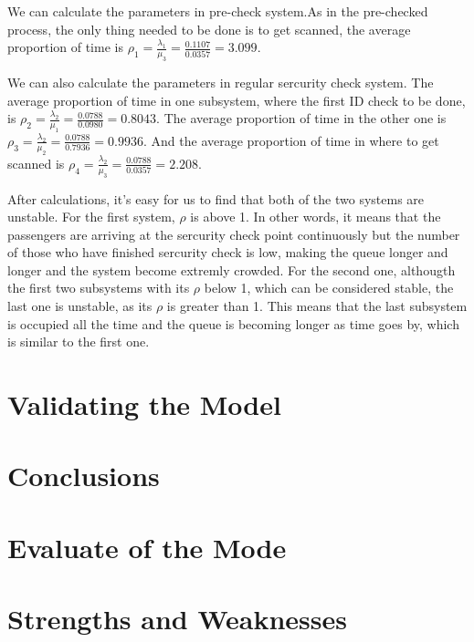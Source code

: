 \documentclass{mcmthesis}
\begin{document}
	We can calculate the parameters in pre-check system.As in the pre-checked process, the only thing needed to be done is to get scanned, the average proportion of time is ${\rho_1 = \frac {\lambda_1}{\mu_3} = \frac {0.1107}{0.0357} = 3.099}$. 
	
	We can also calculate the parameters in regular sercurity check system. The average proportion of time in one subsystem, where the first ID check to be done, is ${\rho_2 = \frac{\lambda_2}{\mu_1} = \frac {0.0788}{0.0980} = 0.8043}$. The average proportion of time in the other one is ${\rho_3= \frac{\lambda_2}{\mu_2} = \frac {0.0788}{0.7936} = 0.9936}$. And the average proportion of time in where to get scanned is ${\rho_4 = \frac{\lambda_2}{\mu_3} = \frac {0.0788}{0.0357} = 2.208}$.
	
	After calculations, it's easy for us to find that both of the two systems are unstable. For the first system,  ${\rho}$ is above 1.  In other words, it means that the passengers are arriving at the sercurity check point continuously but the number of those who have finished sercurity check is low, making the queue longer and longer and the system become extremly crowded. For the second one, althougth the first two subsystems with its ${\rho}$ below 1, which can be considered stable, the last one is unstable, as its ${\rho}$ is greater than 1. This means that the last subsystem is occupied all the time and the queue is becoming longer as time goes by, which is similar to the first one.
\section{Validating the Model}%

\section{Conclusions}%


\section{Evaluate of the Mode}%

\section{Strengths and Weaknesses}%
\end{document}

